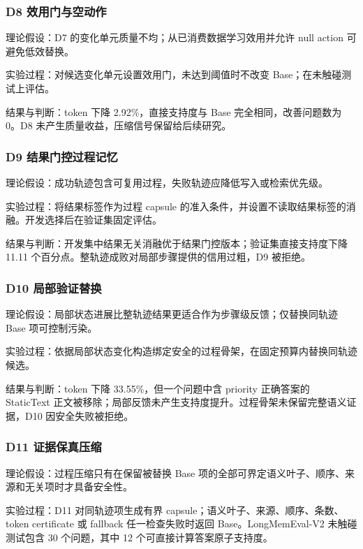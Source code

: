 \subsubsection{D8 效用门与空动作}

理论假设：D7 的变化单元质量不均；从已消费数据学习效用并允许 null action 可避免低效替换。

实验过程：对候选变化单元设置效用门，未达到阈值时不改变 Base；在未触碰测试上评估。

结果与判断：token 下降 2.92\%，直接支持度与 Base 完全相同，改善问题数为 0。D8 未产生质量收益，压缩信号保留给后续研究。

\subsubsection{D9 结果门控过程记忆}

理论假设：成功轨迹包含可复用过程，失败轨迹应降低写入或检索优先级。

实验过程：将结果标签作为过程 capsule 的准入条件，并设置不读取结果标签的消融。开发选择后在验证集固定评估。

结果与判断：开发集中结果无关消融优于结果门控版本；验证集直接支持度下降 11.11 个百分点。整轨迹成败对局部步骤提供的信用过粗，D9 被拒绝。

\subsubsection{D10 局部验证替换}

理论假设：局部状态进展比整轨迹结果更适合作为步骤级反馈；仅替换同轨迹 Base 项可控制污染。

实验过程：依据局部状态变化构造绑定安全的过程骨架，在固定预算内替换同轨迹候选。

结果与判断：token 下降 33.55\%，但一个问题中含 priority 正确答案的 StaticText 正文被移除；局部反馈未产生支持度提升。过程骨架未保留完整语义证据，D10 因安全失败被拒绝。

\subsubsection{D11 证据保真压缩}

理论假设：过程压缩只有在保留被替换 Base 项的全部可界定语义叶子、顺序、来源和无关项时才具备安全性。

实验过程：D11 对同轨迹项生成有界 capsule；语义叶子、来源、顺序、条数、token certificate 或 fallback 任一检查失败时返回 Base。LongMemEval-V2 未触碰测试包含 30 个问题，其中 12 个可直接计算答案原子支持度。

